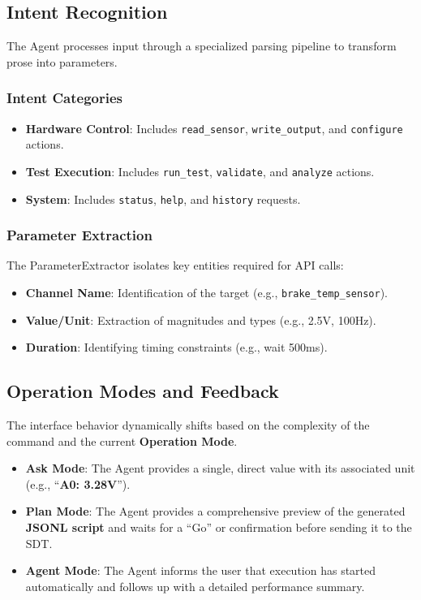 \documentclass[conference]{IEEEtran}
\begin{document}
\subsection{Intent Recognition}
The Agent processes input through a specialized parsing pipeline to transform prose into parameters.
\subsubsection{Intent Categories}
\begin{itemize}
    \item \textbf{Hardware Control}: Includes \texttt{read\_sensor}, \texttt{write\_output}, and \texttt{configure} actions.
    \item \textbf{Test Execution}: Includes \texttt{run\_test}, \texttt{validate}, and \texttt{analyze} actions.
    \item \textbf{System}: Includes \texttt{status}, \texttt{help}, and \texttt{history} requests.
\end{itemize}
\subsubsection{Parameter Extraction}
The ParameterExtractor isolates key entities required for API calls:
\begin{itemize}
    \item \textbf{Channel Name}: Identification of the target (e.g., \texttt{brake\_temp\_sensor}).
    \item \textbf{Value/Unit}: Extraction of magnitudes and types (e.g., 2.5V, 100Hz).
    \item \textbf{Duration}: Identifying timing constraints (e.g., wait 500ms).
\end{itemize}

\subsection{Operation Modes and Feedback}
The interface behavior dynamically shifts based on the complexity of the command and the current \textbf{Operation Mode}.
\begin{itemize}
    \item \textbf{Ask Mode}: The Agent provides a single, direct value with its associated unit (e.g., ``\textbf{A0: 3.28V}'').
    \item \textbf{Plan Mode}: The Agent provides a comprehensive preview of the generated \textbf{JSONL script} and waits for a ``Go'' or confirmation before sending it to the SDT.
    \item \textbf{Agent Mode}: The Agent informs the user that execution has started automatically and follows up with a detailed performance summary.
\end{itemize}
\end{document}
